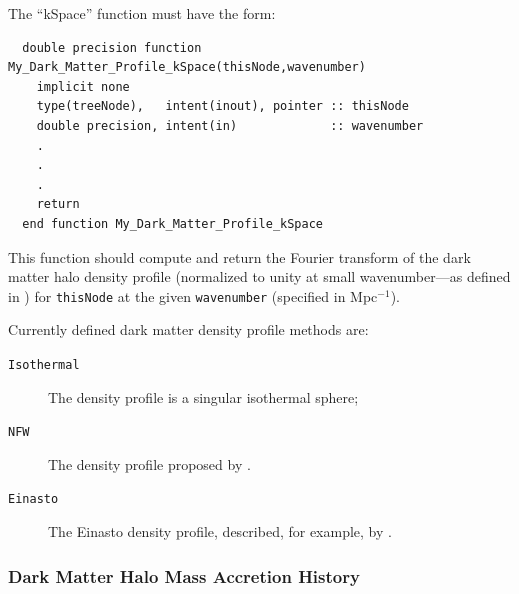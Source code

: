 The ``kSpace'' function must have the form:
\begin{verbatim}
  double precision function My_Dark_Matter_Profile_kSpace(thisNode,wavenumber)
    implicit none
    type(treeNode),   intent(inout), pointer :: thisNode
    double precision, intent(in)             :: wavenumber
    .
    .
    .
    return
  end function My_Dark_Matter_Profile_kSpace
\end{verbatim}
This function should compute and return the Fourier transform of the dark matter halo density profile (normalized to unity at small wavenumber---as defined in \citealt{cooray_halo_2002}) for {\tt thisNode} at the given {\tt wavenumber} (specified in Mpc$^{-1}$).

Currently defined dark matter density profile methods are:
\begin{description}
 \item [{\tt Isothermal}] The density profile is a singular isothermal sphere;
 \item [{\tt NFW}] The density profile proposed by \cite{navarro_universal_1997}.
 \item [{\tt Einasto}] The Einasto density profile, described, for example, by \cite{cardone_spherical_2005}.
\end{description}

\subsubsection{Dark Matter Halo Mass Accretion History}\label{sec:HaloMassAccretionHistory}

